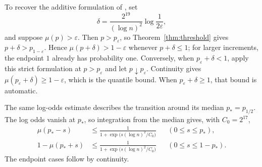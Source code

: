 To recover the additive formulation of \cite[Conjecture~1.2]{FK96}, set
\[
 \delta=\frac{2^{19}}{(\log n)^2}\log\frac1{2\varepsilon},
\]
and suppose $\mu(p)>\varepsilon$. Then $p>p_\varepsilon$, so
Theorem~\ref{thm:threshold} gives $p+\delta>p_{1-\varepsilon}$.
Hence $\mu(p+\delta)>1-\varepsilon$ whenever $p+\delta\le1$;
for larger increments, the endpoint $1$ already has probability one.
Conversely, when $p_\varepsilon+\delta<1$, apply this strict formulation
at $p>p_\varepsilon$ and let $p\downarrow p_\varepsilon$.
Continuity gives $\mu(p_\varepsilon+\delta)\ge1-\varepsilon$, which
is the quantile bound. When $p_\varepsilon+\delta\ge1$, that bound
is automatic.

The same log-odds estimate describes the transition around its median
$p_*=p_{1/2}$. The log odds vanish at $p_*$, so integration from the
median gives, with $C_0=2^{17}$,
\[
\begin{aligned}
 \mu(p_*-s)
 &\le \frac{1}{1+\exp\!\bigl(s(\log n)^2/C_0\bigr)}
 &&(0\le s\le p_*),\\
 1-\mu(p_*+s)
 &\le \frac{1}{1+\exp\!\bigl(s(\log n)^2/C_0\bigr)}
 &&(0\le s\le1-p_*).
\end{aligned}
\]
The endpoint cases follow by continuity.
